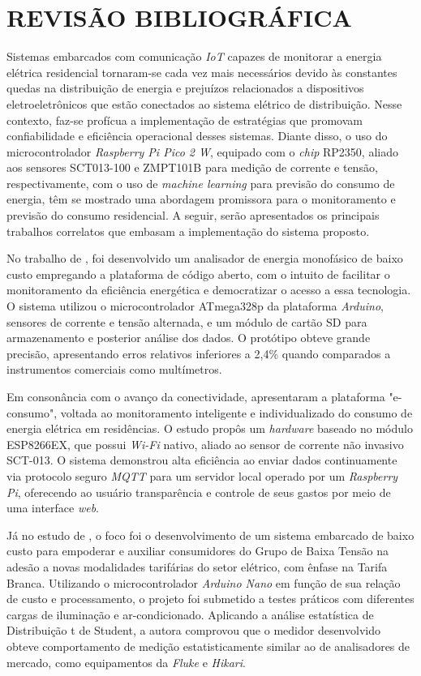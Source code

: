 \chapter{REVISÃO BIBLIOGRÁFICA}
Sistemas embarcados com comunicação \textit{IoT} capazes de monitorar a energia elétrica residencial tornaram-se cada vez mais necessários devido às constantes quedas na distribuição de energia e prejuízos relacionados a dispositivos eletroeletrônicos que estão conectados ao sistema elétrico de distribuição. Nesse contexto, faz-se profícua a implementação de estratégias que promovam confiabilidade e eficiência operacional desses sistemas. Diante disso, o uso do microcontrolador \textit{Raspberry Pi Pico 2 W}, equipado com o \textit{chip} RP2350, aliado aos sensores SCT013-100 e ZMPT101B para medição de corrente e tensão, respectivamente, com o uso de \textit{machine learning} para previsão do consumo de energia, têm se mostrado uma abordagem promissora para o monitoramento e previsão do consumo residencial. A seguir, serão apresentados os principais trabalhos correlatos que embasam a implementação do sistema proposto.

No trabalho de , foi desenvolvido um analisador de energia monofásico de baixo custo empregando a plataforma de código aberto, com o intuito de facilitar o monitoramento da eficiência energética e democratizar o acesso a essa tecnologia. O sistema utilizou o microcontrolador ATmega328p da plataforma \textit{Arduino}, sensores de corrente e tensão alternada, e um módulo de cartão SD para armazenamento e posterior análise dos dados. O protótipo obteve grande precisão, apresentando erros relativos inferiores a 2,4\% quando comparados a instrumentos comerciais como multímetros.

Em consonância com o avanço da conectividade,  apresentaram a plataforma "e-consumo", voltada ao monitoramento inteligente e individualizado do consumo de energia elétrica em residências. O estudo propôs um \textit{hardware} baseado no módulo ESP8266EX, que possui \textit{Wi-Fi} nativo, aliado ao sensor de corrente não invasivo SCT-013. O sistema demonstrou alta eficiência ao enviar dados continuamente via protocolo seguro \textit{MQTT} para um servidor local operado por um \textit{Raspberry Pi}, oferecendo ao usuário transparência e controle de seus gastos por meio de uma interface \textit{web}.

Já no estudo de , o foco foi o desenvolvimento de um sistema embarcado de baixo custo para empoderar e auxiliar consumidores do Grupo de Baixa Tensão na adesão a novas modalidades tarifárias do setor elétrico, com ênfase na Tarifa Branca. Utilizando o microcontrolador \textit{Arduino Nano} em função de sua relação de custo e processamento, o projeto foi submetido a testes práticos com diferentes cargas de iluminação e ar-condicionado. Aplicando a análise estatística de Distribuição t de Student, a autora comprovou que o medidor desenvolvido obteve comportamento de medição estatisticamente similar ao de analisadores de mercado, como equipamentos da \textit{Fluke} e \textit{Hikari}.

